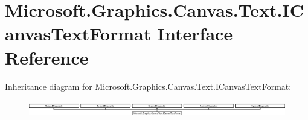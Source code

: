 \hypertarget{interface_microsoft_1_1_graphics_1_1_canvas_1_1_text_1_1_i_canvas_text_format}{}\section{Microsoft.\+Graphics.\+Canvas.\+Text.\+I\+Canvas\+Text\+Format Interface Reference}
\label{interface_microsoft_1_1_graphics_1_1_canvas_1_1_text_1_1_i_canvas_text_format}
Inheritance diagram for Microsoft.\+Graphics.\+Canvas.\+Text.\+I\+Canvas\+Text\+Format\+:\begin{figure}[H]
\begin{center}
\leavevmode
\includegraphics[height=0.713376cm]{interface_microsoft_1_1_graphics_1_1_canvas_1_1_text_1_1_i_canvas_text_format}
\end{center}
\end{figure}
